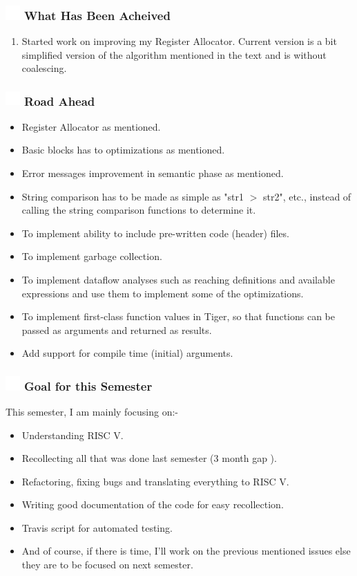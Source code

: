 \documentclass{beamer}
\newcommand{\ft}[1]{
  \frametitle{\includegraphics[height=0.55cm, width=0.55cm, keepaspectratio]{assets/tiger.png} #1}
}
\newcounter{saveenumi}
\newcommand{\seti}{\setcounter{saveenumi}{\value{enumi}}}
\newcommand{\conti}{\setcounter{enumi}{\value{saveenumi}}}
\begin{document}
\begin{frame}[fragile]
  \ft{What Has Been Acheived}
  \begin{enumerate}
    \conti
    \item Started work on improving my Register Allocator. Current version is a bit simplified version of the algorithm mentioned in the text and is without coalescing.
    \seti
  \end{enumerate}
\end{frame}

\begin{frame}[fragile]
  \ft{Road Ahead}
  \begin{itemize}
    \item Register Allocator as mentioned.
    \item Basic blocks has to optimizations as mentioned.
    \item Error messages improvement in semantic phase as mentioned.
    \item String comparison has to be made as simple as "str1 $>$ str2", etc.,  instead of calling the string comparison functions to determine it.
    \item To implement ability to include pre-written code (header) files.
    \item To implement garbage collection.
    \item To implement dataflow analyses such as reaching definitions and available expressions and use them to implement some of the optimizations. 
    \item To implement first-class function values in Tiger, so that functions can be passed as arguments and returned as results.
    \item Add support for compile time (initial) arguments.
  \end{itemize}
\end{frame}
\begin{frame}
  \ft{Goal for this Semester}
  This semester, I am mainly focusing on:-
  \begin{itemize}
    \item Understanding RISC V.
    \item Recollecting all that was done last semester (3 month gap \Xey). %
    \item Refactoring, fixing bugs and translating everything to RISC V.
    \item Writing good documentation of the code for easy recollection.
    \item Travis script for automated testing.
    \item And of course, if there is time, I'll work on the previous mentioned issues else they are to be focused on next semester.
  \end{itemize}
\end{frame}
\end{document}
